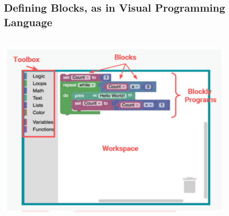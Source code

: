 \documentclass[a4paper,12pt,oneside]{book}
\begin{document}
\subsection{Defining Blocks, as in Visual Programming Language}
\\\hfill\includegraphics[width=12cm, height=9cm]{imag2}\\[0.5cm]
\end{document}
